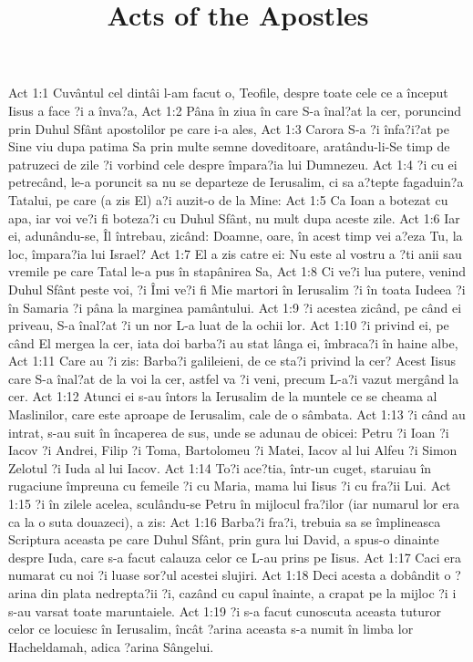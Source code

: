 

\title{Acts of the Apostles}

Act 1:1  Cuvântul cel dintâi l-am facut o, Teofile, despre toate cele ce a început Iisus a face ?i a înva?a,
Act 1:2  Pâna în ziua în care S-a înal?at la cer, poruncind prin Duhul Sfânt apostolilor pe care i-a ales,
Act 1:3  Carora S-a ?i înfa?i?at pe Sine viu dupa patima Sa prin multe semne doveditoare, aratându-li-Se timp de patruzeci de zile ?i vorbind cele despre împara?ia lui Dumnezeu.
Act 1:4  ?i cu ei petrecând, le-a poruncit sa nu se departeze de Ierusalim, ci sa a?tepte fagaduin?a Tatalui, pe care (a zis El) a?i auzit-o de la Mine:
Act 1:5  Ca Ioan a botezat cu apa, iar voi ve?i fi boteza?i cu Duhul Sfânt, nu mult dupa aceste zile.
Act 1:6  Iar ei, adunându-se, Îl întrebau, zicând: Doamne, oare, în acest timp vei a?eza Tu, la loc, împara?ia lui Israel?
Act 1:7  El a zis catre ei: Nu este al vostru a ?ti anii sau vremile pe care Tatal le-a pus în stapânirea Sa,
Act 1:8  Ci ve?i lua putere, venind Duhul Sfânt peste voi, ?i Îmi ve?i fi Mie martori în Ierusalim ?i în toata Iudeea ?i în Samaria ?i pâna la marginea pamântului.
Act 1:9  ?i acestea zicând, pe când ei priveau, S-a înal?at ?i un nor L-a luat de la ochii lor.
Act 1:10  ?i privind ei, pe când El mergea la cer, iata doi barba?i au stat lânga ei, îmbraca?i în haine albe,
Act 1:11  Care au ?i zis: Barba?i galileieni, de ce sta?i privind la cer? Acest Iisus care S-a înal?at de la voi la cer, astfel va ?i veni, precum L-a?i vazut mergând la cer.
Act 1:12  Atunci ei s-au întors la Ierusalim de la muntele ce se cheama al Maslinilor, care este aproape de Ierusalim, cale de o sâmbata.
Act 1:13  ?i când au intrat, s-au suit în încaperea de sus, unde se adunau de obicei: Petru ?i Ioan ?i Iacov ?i Andrei, Filip ?i Toma, Bartolomeu ?i Matei, Iacov al lui Alfeu ?i Simon Zelotul ?i Iuda al lui Iacov.
Act 1:14  To?i ace?tia, într-un cuget, staruiau în rugaciune împreuna cu femeile ?i cu Maria, mama lui Iisus ?i cu fra?ii Lui.
Act 1:15  ?i în zilele acelea, sculându-se Petru în mijlocul fra?ilor (iar numarul lor era ca la o suta douazeci), a zis:
Act 1:16  Barba?i fra?i, trebuia sa se împlineasca Scriptura aceasta pe care Duhul Sfânt, prin gura lui David, a spus-o dinainte despre Iuda, care s-a facut calauza celor ce L-au prins pe Iisus.
Act 1:17  Caci era numarat cu noi ?i luase sor?ul acestei slujiri.
Act 1:18  Deci acesta a dobândit o ?arina din plata nedrepta?ii ?i, cazând cu capul înainte, a crapat pe la mijloc ?i i s-au varsat toate maruntaiele.
Act 1:19  ?i s-a facut cunoscuta aceasta tuturor celor ce locuiesc în Ierusalim, încât ?arina aceasta s-a numit în limba lor Hacheldamah, adica ?arina Sângelui.
